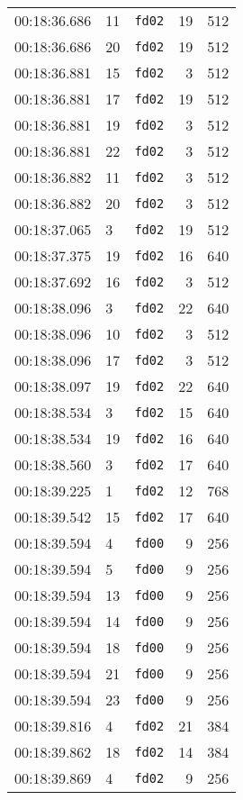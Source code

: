 \documentclass{article}
\begin{document}
\begin{longtable}{lllrr}
00:18:36.686 & 11 & \texttt{fd02} & 19 & 512 \\
00:18:36.686 & 20 & \texttt{fd02} & 19 & 512 \\
00:18:36.881 & 15 & \texttt{fd02} & 3 & 512 \\
00:18:36.881 & 17 & \texttt{fd02} & 19 & 512 \\
00:18:36.881 & 19 & \texttt{fd02} & 3 & 512 \\
00:18:36.881 & 22 & \texttt{fd02} & 3 & 512 \\
00:18:36.882 & 11 & \texttt{fd02} & 3 & 512 \\
00:18:36.882 & 20 & \texttt{fd02} & 3 & 512 \\
00:18:37.065 & 3 & \texttt{fd02} & 19 & 512 \\
00:18:37.375 & 19 & \texttt{fd02} & 16 & 640 \\
00:18:37.692 & 16 & \texttt{fd02} & 3 & 512 \\
00:18:38.096 & 3 & \texttt{fd02} & 22 & 640 \\
00:18:38.096 & 10 & \texttt{fd02} & 3 & 512 \\
00:18:38.096 & 17 & \texttt{fd02} & 3 & 512 \\
00:18:38.097 & 19 & \texttt{fd02} & 22 & 640 \\
00:18:38.534 & 3 & \texttt{fd02} & 15 & 640 \\
00:18:38.534 & 19 & \texttt{fd02} & 16 & 640 \\
00:18:38.560 & 3 & \texttt{fd02} & 17 & 640 \\
00:18:39.225 & 1 & \texttt{fd02} & 12 & 768 \\
00:18:39.542 & 15 & \texttt{fd02} & 17 & 640 \\
00:18:39.594 & 4 & \texttt{fd00} & 9 & 256 \\
00:18:39.594 & 5 & \texttt{fd00} & 9 & 256 \\
00:18:39.594 & 13 & \texttt{fd00} & 9 & 256 \\
00:18:39.594 & 14 & \texttt{fd00} & 9 & 256 \\
00:18:39.594 & 18 & \texttt{fd00} & 9 & 256 \\
00:18:39.594 & 21 & \texttt{fd00} & 9 & 256 \\
00:18:39.594 & 23 & \texttt{fd00} & 9 & 256 \\
00:18:39.816 & 4 & \texttt{fd02} & 21 & 384 \\
00:18:39.862 & 18 & \texttt{fd02} & 14 & 384 \\
00:18:39.869 & 4 & \texttt{fd02} & 9 & 256 \\

\end{longtable}
\end{document}
